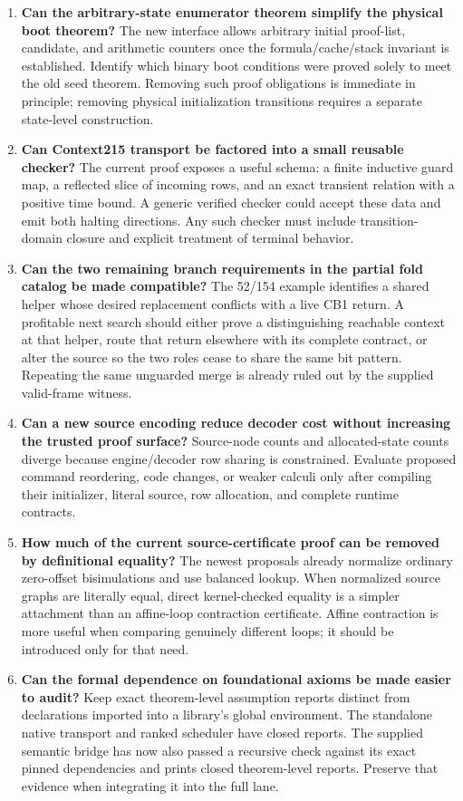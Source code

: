 \documentclass[11pt]{article}
\begin{document}
\begin{enumerate}
\item \textbf{Can the arbitrary-state enumerator theorem simplify the physical boot theorem?}
The new interface allows arbitrary initial proof-list, candidate, and arithmetic counters once the formula/cache/stack invariant is established. Identify which binary boot conditions were proved solely to meet the old seed theorem. Removing such proof obligations is immediate in principle; removing physical initialization transitions requires a separate state-level construction.

\item \textbf{Can Context215 transport be factored into a small reusable checker?}
The current proof exposes a useful schema: a finite inductive guard map, a reflected slice of incoming rows, and an exact transient relation with a positive time bound. A generic verified checker could accept these data and emit both halting directions. Any such checker must include transition-domain closure and explicit treatment of terminal behavior.

\item \textbf{Can the two remaining branch requirements in the partial fold catalog be made compatible?}
The 52/154 example identifies a shared helper whose desired replacement conflicts with a live CB1 return. A profitable next search should either prove a distinguishing reachable context at that helper, route that return elsewhere with its complete contract, or alter the source so the two roles cease to share the same bit pattern. Repeating the same unguarded merge is already ruled out by the supplied valid-frame witness.

\item \textbf{Can a new source encoding reduce decoder cost without increasing the trusted proof surface?}
Source-node counts and allocated-state counts diverge because engine/decoder row sharing is constrained. Evaluate proposed command reordering, code changes, or weaker calculi only after compiling their initializer, literal source, row allocation, and complete runtime contracts.

\item \textbf{How much of the current source-certificate proof can be removed by definitional equality?}
The newest proposals already normalize ordinary zero-offset bisimulations and use balanced lookup. When normalized source graphs are literally equal, direct kernel-checked equality is a simpler attachment than an affine-loop contraction certificate. Affine contraction is more useful when comparing genuinely different loops; it should be introduced only for that need.

\item \textbf{Can the formal dependence on foundational axioms be made easier to audit?}
Keep exact theorem-level assumption reports distinct from declarations imported into a library's global environment. The standalone native transport and ranked scheduler have closed reports. The supplied semantic bridge has now also passed a recursive check against its exact pinned dependencies and prints closed theorem-level reports. Preserve that evidence when integrating it into the full lane.
\end{enumerate}
\end{document}
